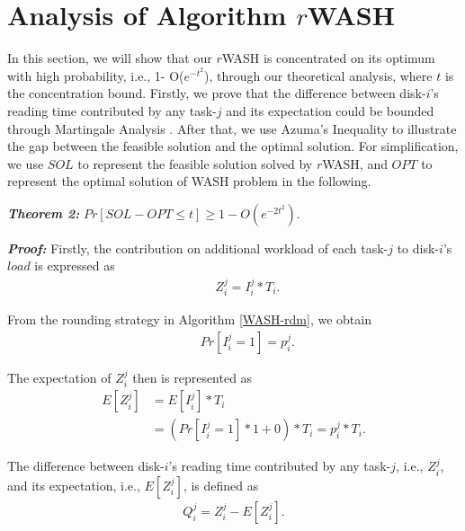 \documentclass[conference]{IEEEtran}
\begin{document}
\section{Analysis of Algorithm $r$WASH}\label{Analysis}

In this section, we will show that our $r$WASH is concentrated on its optimum with high probability, i.e., 1- O($e^{-t^2}$), through our theoretical analysis, where $t$ is the concentration bound. Firstly, we prove that the difference between disk-$i$'s reading time contributed by any task-$j$ and its expectation could be bounded through Martingale Analysis \cite{b12}. After that, we use Azuma's Inequality to illustrate the gap between the feasible solution and the optimal solution. For simplification, we use $SOL$ to represent the feasible solution solved by $r$WASH, and $OPT$ to represent the optimal solution of WASH problem in the following.

\vspace{0.2cm}
\emph{\textbf{Theorem 2:}} $Pr[SOL - OPT\leq t] \geq 1 - O(e^{-2t^2})$.

\emph{\textbf{Proof:}} Firstly, the contribution on additional workload of each task-$j$ to disk-$i$'s $load$ is expressed as
\vspace{-0.1cm}
 \begin{align}
&\;\;\;\;\;Z_i^j = I_i^j*T_i.
\end{align}

\vspace{-0.2cm}
From the rounding strategy in Algorithm \ref{WASH-rdm}, we obtain
 \vspace{-0.2cm}
 \begin{align}
&\;\;\;\;\;Pr[I_i^j = 1] = p_i^j. \nonumber
\end{align}

\vspace{-0.2cm}
The expectation of $Z_i^j$ then is represented as
\vspace{-0.2cm}
\begin{align}
E[Z_i^j] &= E[I_i^j]*T_i \nonumber\\
&= (Pr[I_i^j = 1] * 1 +  0)*T_i = p_i^j*T_i.\label{prove:expect}
\end{align}

\vspace{-0.2cm}
The difference between disk-$i$'s reading time contributed by any task-$j$, i.e., $Z_i^j$, and its expectation, i.e., $E[Z_i^j]$, is defined as
 \vspace{-0.1cm}
\begin{align}
Q_i^j = Z_i^j - E[Z_i^j].\label{prove:diff}
\end{align}
\end{document}
